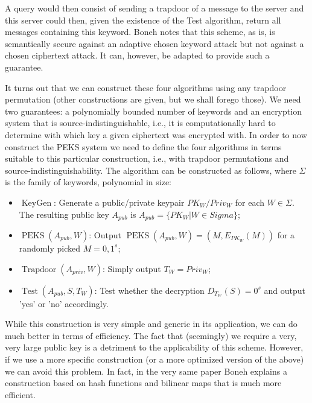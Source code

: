\documentclass[11pt, a4paper]{article}
\newcommand{\op}[1]{\operatorname{#1}}
\begin{document}
A query would then consist of sending a trapdoor of a message to the server and this server could then, given the existence of the Test algorithm, return all messages containing this keyword.
Boneh notes that this scheme, as is, is semantically secure against an adaptive chosen keyword attack but not against a chosen ciphertext attack.
It can, however, be adapted to provide such a guarantee.

It turns out that we can construct these four algorithms using any trapdoor permutation (other constructions are given, but we shall forego those). 
We need two guarantees: a polynomially bounded number of keywords and an encryption system that is source-indistinguishable, i.e., it is computationally hard to determine with which key a given ciphertext was encrypted with. 
In order to now construct the PEKS system we need to define the four algorithms in terms suitable to this particular construction, i.e., with trapdoor permutations and source-indistinguishability. 
The algorithm can be constructed as follows, where $\Sigma$ is the family of keywords, polynomial in size:
\begin{itemize}
    \item $\op{KeyGen}$: Generate a public/private keypair $PK_W/Priv_W$ for each $W \in \Sigma$. The resulting public key $A_{pub}$ is $A_{pub} = \{ PK_W | W \in Sigma \}$;
    \item $\op{PEKS}(A_{pub},W)$: Output $\op{PEKS}(A_{pub}, W) = (M, E_{PK_W}(M))$ for a randomly picked $M = {0,1}^s$;
    \item $\op{Trapdoor}(A_{priv},W)$: Simply output $T_W = Priv_W$;
    \item $\op{Test}(A_{pub},S,T_W)$: Test whether the decryption $D_{T_W}(S) = 0^s$ and output 'yes' or 'no' accordingly.
\end{itemize}

While this construction is very simple and generic in its application, we can do much better in terms of efficiency. 
The fact that (seemingly) we require a very, very large public key is a detriment to the applicability of this scheme.
However, if we use a more specific construction (or a more optimized version of the above) we can avoid this problem.
In fact, in the very same paper Boneh explains a construction based on hash functions and bilinear maps that is much more efficient.
\end{document}
